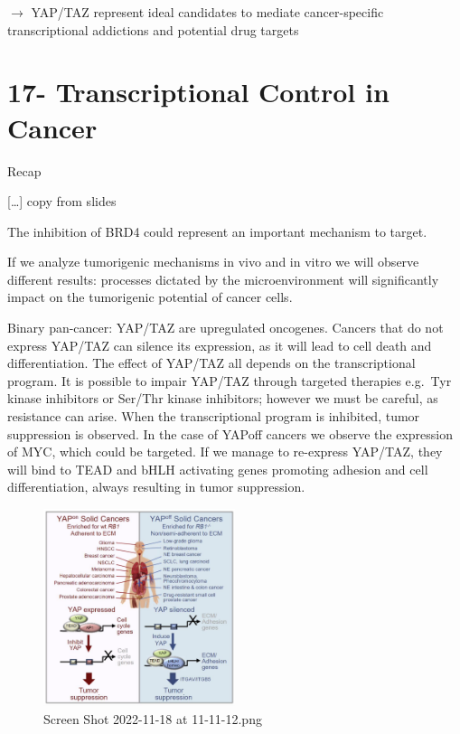 $\rightarrow$ YAP/TAZ represent ideal candidates to mediate cancer-specific transcriptional addictions
and potential drug targets


\hypertarget{transcriptional-control-in-cancer}{%
\section{17- Transcriptional Control in Cancer}\label{transcriptional-control-in-cancer}}

Recap

{[}\ldots{]} copy from slides

The inhibition of BRD4 could represent an important mechanism to target.

If we analyze tumorigenic mechanisms in vivo and in vitro we will observe different results: processes dictated by the microenvironment will significantly impact on the tumorigenic potential of cancer cells.

Binary pan-cancer: YAP/TAZ are upregulated oncogenes. Cancers that do not express YAP/TAZ can silence its expression, as it will lead to cell death and differentiation. The effect of YAP/TAZ all depends on the transcriptional program. It is possible to impair YAP/TAZ through targeted therapies e.g.~Tyr kinase inhibitors or Ser/Thr kinase inhibitors; however we must be careful, as resistance can arise. When the transcriptional program is inhibited, tumor suppression is observed. In the case of YAPoff cancers we observe the expression of MYC, which could be targeted. If we manage to re-express YAP/TAZ, they will bind to TEAD and bHLH activating genes promoting adhesion and cell differentiation, always resulting in tumor suppression.

\begin{figure}
\centering
\includegraphics[width=0.5\textwidth]{../_resources/Screen_Shot_2022-11-18_at_11-11-12.png}
\caption{Screen Shot 2022-11-18 at 11-11-12.png}
\end{figure}


